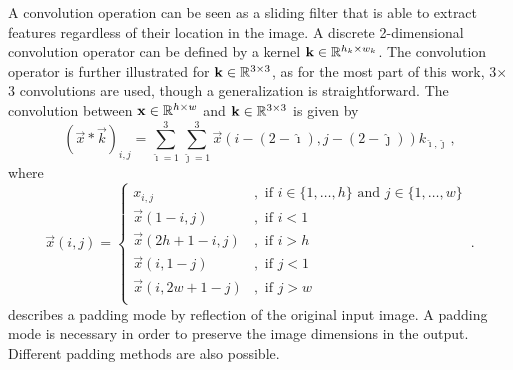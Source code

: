 A convolution operation can be seen as a sliding filter
that is able to extract features regardless of their location in the image.
A discrete 2-dimensional convolution operator can be defined by a kernel $\mathbf k \in \mathbb{R}^{h_k\times w_k}$. 
The convolution operator is further illustrated for $\mathbf k \in \mathbb{R}^{3\times3}$, 
as for the most part of this work, 3$\times$3 convolutions are used, 
though a generalization is straightforward.
The convolution between $\mathbf x \in \mathbb{R}^{h\times w}$ and $\mathbf k \in \mathbb{R}^{3\times3}$ is given by
\begin{equation}
\label{eqn:convolution_kernel}
    (\vec x * \vec k)_{i,j}
    = \sum_{\hat \imath=1}^3 \sum_{\hat \jmath=1}^3 
        \vec x\left (i - (2 - \hat \imath), j - (2 - \hat \jmath) \right) k_{\hat \imath,\hat \jmath} \,,
\end{equation}
where
\begin{equation}
\label{eqn:convolution_padding}
    \vec x(i,j) =
    \begin{cases}
        x_{i,j} &, \text{ if } i \in \{1,\ldots, h\} \text{ and } j \in \{1,\ldots, w\} \\
        \vec x(1-i,j) &, \text{ if } i < 1 \\
        \vec x(2h + 1 - i,j) &, \text{ if } i > h \\
        \vec x(i,1-j) &, \text{ if } j < 1 \\
        \vec x(i, 2w + 1 - j) &, \text{ if } j > w \\
    \end{cases} \,.
\end{equation}
 describes a padding mode by reflection of the original input image.
A padding mode is necessary in order to preserve the image dimensions in the output.
Different padding methods are also possible.


